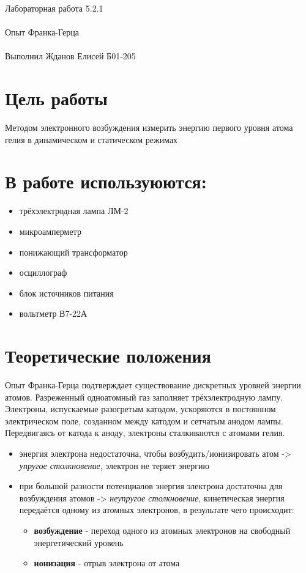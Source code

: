 \documentclass{astroedu-lab}
\begin{document}
\pagestyle{plain}

\begin{problem}{\huge Лабораторная работа 5.2.1\\\\Опыт Франка-Герца\\\\Выполнил Жданов Елисей Б01-205}

\section{Цель работы}
Методом электронного возбуждения измерить энергию первого уровня атома гелия в динамическом и статическом режимах

\section{В работе используюются:}
\begin{itemize}
    \item трёхэлектродная лампа ЛМ-2
    \item микроамперметр
    \item понижающий трансформатор
    \item осциллограф
    \item блок источников питания
    \item вольтметр В7-22А
\end{itemize}

\section{Теоретические положения}
Опыт Франка-Герца подтверждает существование дискретных уровней энергии атомов. Разреженный одноатомный газ заполняет трёхэлектродную лампу. Электроны, испускаемые разогретым катодом, ускоряются в постоянном электрическом поле, созданном между катодом и сетчатым анодом лампы. Передвигаясь от катода к аноду, электроны сталкиваются с атомами гелия.
\begin{itemize}
    \item энергия электрона недостаточна, чтобы возбудить/ионизировать атом -> \textit{упругое столкновение}, электрон не теряет энергию
    \item при большой разности потенциалов энергия электрона достаточна для возбуждения атомов -> \textit{неупругое столкновение}, кинетическая энергия передаётся одному из атомных электронов, в результате чего происходит:
    \begin{itemize}
        \item \textbf{возбуждение} - переход одного из атомных электронов на свободный энергетический уровень
        \item \textbf{ионизация} - отрыв электрона от атома 
    \end{itemize}
\end{itemize}


\end{problem}
\end{document}
